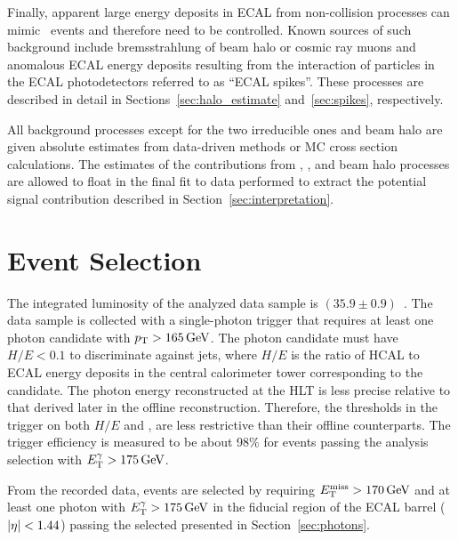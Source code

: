 Finally, apparent large energy deposits in ECAL from non-collision processes can mimic \gmet\  events and therefore need to be controlled. 
Known sources of such background include bremsstrahlung of beam halo or cosmic ray muons and anomalous ECAL energy deposits resulting from the interaction of particles in the ECAL photodetectors referred to as ``ECAL spikes''. 
These processes are described in detail in Sections~\ref{sec:halo_estimate} and~\ref{sec:spikes}, respectively.

All background processes except for the two irreducible ones and beam halo are given absolute estimates from data-driven methods or MC cross section calculations. 
The estimates of the contributions from \zinvg, \wlng, and beam halo processes are allowed to float in the final fit to data performed to extract the potential signal contribution described in Section~\ref{sec:interpretation}.

\section{Event Selection}
\label{sec:event_selection}


The integrated luminosity of the analyzed data sample is $(35.9\pm0.9)$\fbinv~\cite{CMS:2017sdi}. 
The data sample is collected with a single-photon trigger that requires at least one photon candidate with $p_{\mathrm{T}} > 165\,\text{Ge\hspace{-.08em}V}$. 
The photon candidate must have $H/E < 0.1$ to discriminate against jets, where $H/E$ is the ratio of HCAL to ECAL energy deposits in the central calorimeter tower corresponding to the candidate.
The photon energy reconstructed at the HLT is less precise relative to that derived later in the offline reconstruction. 
Therefore, the thresholds in the trigger on both $H/E$ and \ETg, are less restrictive than their offline counterparts.  
The trigger efficiency is measured to be about 98\% for events passing the analysis selection with $E_{\mathrm{T}}^{\gamma} > 175\,\text{Ge\hspace{-.08em}V}$.

From the recorded data, events are selected by requiring $E_{\mathrm{T}}^{\text{miss}} > 170\,\text{Ge\hspace{-.08em}V}$ and at least one photon with $E_{\mathrm{T}}^{\gamma} > 175\,\text{Ge\hspace{-.08em}V}$ in the fiducial region of the ECAL barrel ($\lvert \eta \rvert < 1.44$) passing the selected presented in Section~\ref{sec:photons}. 


